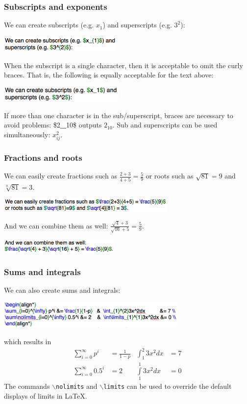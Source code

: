 \begin{frame} \frametitle{Subscripts and exponents}
We can create subscripts (e.g. $x_1$) and superscripts (e.g. $3^2$):
\begin{center}
\includegraphics[height=8mm]{math/subSuperscript}
\end{center}
When the subscript is a single character, then it is acceptable to omit the curly braces. That is, the following is equally acceptable for the text above:
\begin{center}
\includegraphics[height=8mm]{math/subSuperscriptNoBraces}
\end{center}
If more than one character is in the sub/superscript, braces are necessary to avoid problems: {\color{braces}\${\color{black}2\textbf{\_}10}\$} outputs $2_10$. Sub and superscripts can be used simultaneously: $x_{ij}^2$.
\end{frame}

\begin{frame} \frametitle{Fractions and roots}
We can easily create fractions such as $\frac{2+3}{4+5} = \frac{5}{9}$ or roots such as $\sqrt{81}=9$ and $\sqrt[4]{81} = 3$.
\begin{center}
\includegraphics[height=7mm]{math/fracRoots}
\end{center}
And we can combine them as well:
$\frac{\sqrt{4} + 3}{\sqrt{16} + 5} = \frac{5}{9}$.
\begin{center}
\includegraphics[height=7mm]{math/fracRootsCombined}
\end{center}
\end{frame}

\begin{frame} \frametitle{Sums and integrals}
We can also create sums and integrals:
\begin{center}
\includegraphics[height=14mm]{math/sumIntegral}
\end{center}
which results in
\begin{align*}
\sum_{i=0}^{\infty} p^i &= \frac{1}{1-p}   &  \int_{1}^{2}3x^2dx          &= 7 \\
\sum\nolimits_{i=0}^{\infty} 0.5^i &= 2    &  \int\limits_{1}^{1}3x^2dx &= 0
\end{align*}
The commands \texttt{\color{command}$\backslash$nolimits} and \texttt{\color{command}$\backslash$limits} can be used to override the default displays of limits in LaTeX.
\end{frame}

